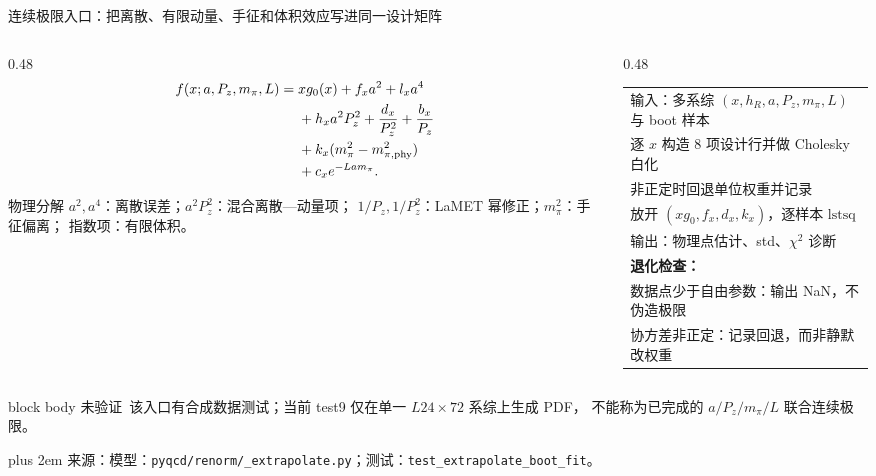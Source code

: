 \documentclass[UTF8,aspectratio=169,11pt]{ctexbeamer}
\newcommand{\source}[1]{%
  \par\vspace{0.02em}\begingroup\fontsize{6}{6.8}\selectfont\raggedright\sloppy
  \setlength{\emergencystretch}{3em}\rightskip=0pt plus 2em
  \color{muted}来源：#1\par\endgroup}
\newcommand{\unverified}{\textcolor{warning}{未验证}}
\begin{document}
\begin{frame}[t]{连续极限入口：把离散、有限动量、手征和体积效应写进同一设计矩阵}
  \begin{columns}[T,totalwidth=\textwidth]
    \begin{column}{0.48\textwidth}
      {\small\begin{equation*}
        \begin{aligned}
          f(x;a,P_z,m_\pi,L)={}&xg_0(x)+f_xa^2+l_xa^4\\
          &+h_xa^2P_z^2+\frac{d_x}{P_z^2}+\frac{b_x}{P_z}\\
          &+k_x(m_\pi^2-m_{\pi,\rm phy}^2)\\[-0.12em]
          &+c_xe^{-La m_\pi}.
        \end{aligned}
      \end{equation*}}
      \begin{block}{物理分解}
        \(a^2,a^4\)：离散误差；\(a^2P_z^2\)：混合离散—动量项；
        \(1/P_z,1/P_z^2\)：LaMET 幂修正；\(m_\pi^2\)：手征偏离；
        指数项：有限体积。
      \end{block}
    \end{column}
    \begin{column}{0.48\textwidth}
      \footnotesize
      \begin{tabularx}{0.94\linewidth}{@{}X@{}}
        输入：多系综 \((x,h_R,a,P_z,m_\pi,L)\) 与 boot 样本\\
        \quad 逐 \(x\) 构造 8 项设计行并做 Cholesky 白化\\
        \quad 非正定时回退单位权重并记录\\
        \quad 放开 \((xg_0,f_x,d_x,k_x)\)，逐样本 \(\mathrm{lstsq}\)\\
        输出：物理点估计、std、\(\chi^2\) 诊断\\[0.25em]
        \textbf{退化检查：}\\
        \quad 数据点少于自由参数：输出 NaN，不伪造极限\\
        \quad 协方差非正定：记录回退，而非静默改权重\\
      \end{tabularx}
    \end{column}
  \end{columns}
  \vspace{0.08em}
  \begin{beamercolorbox}[wd=0.98\textwidth,sep=0.28em,rounded=true]{block body}
    \scriptsize\unverified\ 该入口有合成数据测试；当前 test9 仅在单一 \(L24\times72\) 系综上生成 PDF，
    不能称为已完成的 \(a/P_z/m_\pi/L\) 联合连续极限。
  \end{beamercolorbox}
  \vspace{-0.10em}
  \source{模型：\nolinkurl{pyqcd/renorm/_extrapolate.py}；测试：\texttt{test\_extrapolate\_boot\_fit}。}
\end{frame}
\end{document}
